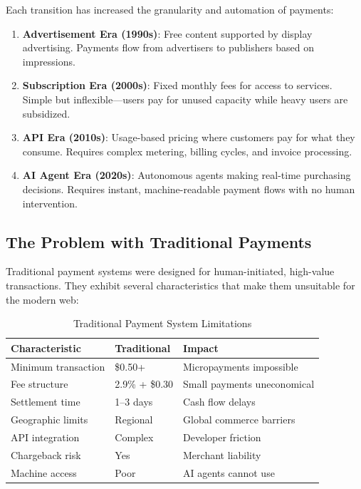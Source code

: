 Each transition has increased the granularity and automation of payments:

\begin{enumerate}
    \item \textbf{Advertisement Era (1990s)}: Free content supported by display advertising. Payments flow from advertisers to publishers based on impressions.

    \item \textbf{Subscription Era (2000s)}: Fixed monthly fees for access to services. Simple but inflexible---users pay for unused capacity while heavy users are subsidized.

    \item \textbf{API Era (2010s)}: Usage-based pricing where customers pay for what they consume. Requires complex metering, billing cycles, and invoice processing.

    \item \textbf{AI Agent Era (2020s)}: Autonomous agents making real-time purchasing decisions. Requires instant, machine-readable payment flows with no human intervention.
\end{enumerate}

\subsection{The Problem with Traditional Payments}

Traditional payment systems were designed for human-initiated, high-value transactions. They exhibit several characteristics that make them unsuitable for the modern web:

\begin{table}[htbp]
\centering
\caption{Traditional Payment System Limitations}
\label{tab:traditional-limitations}
\begin{tabular}{l l p{5cm}}
\toprule
\textbf{Characteristic} & \textbf{Traditional} & \textbf{Impact} \\
\midrule
Minimum transaction & \$0.50+ & Micropayments impossible \\
Fee structure & 2.9\% + \$0.30 & Small payments uneconomical \\
Settlement time & 1--3 days & Cash flow delays \\
Geographic limits & Regional & Global commerce barriers \\
API integration & Complex & Developer friction \\
Chargeback risk & Yes & Merchant liability \\
Machine access & Poor & AI agents cannot use \\
\bottomrule
\end{tabular}
\end{table}

